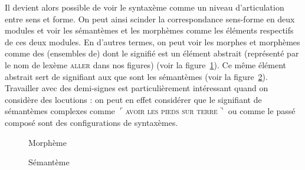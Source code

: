 Il devient alors possible de voir le syntaxème comme un niveau d’articulation entre sens et forme. On peut ainsi scinder la correspondance sens-forme en deux modules et voir les sémantèmes et les morphèmes comme les éléments respectifs de ces deux modules. En d’autres termes, on peut voir les morphes et morphèmes comme des (ensembles de)  dont le signifié est un élément abstrait (représenté par le nom de lexème \textsc{aller} dans nos figures) (voir la figure~\ref{fig:2.3-morpheme}). Ce même élément abstrait sert de signifiant aux  que sont les sémantèmes (voir la figure~\ref{fig:2.3-semanteme}). Travailler avec des demi-signes est particulièrement intéressant quand on considère des locutions : on peut en effet considérer que le signifiant de sémantèmes complexes comme $⌜$\textsc{avoir} \textsc{les} \textsc{pieds} \textsc{sur} \textsc{terre}$⌝$ ou comme le passé composé sont des configurations de syntaxèmes.

\begin{figure}
\caption{Morphème\label{fig:2.3-morpheme}}
\end{figure}

\begin{figure}
\caption{Sémantème\label{fig:2.3-semanteme}}    
\end{figure}



